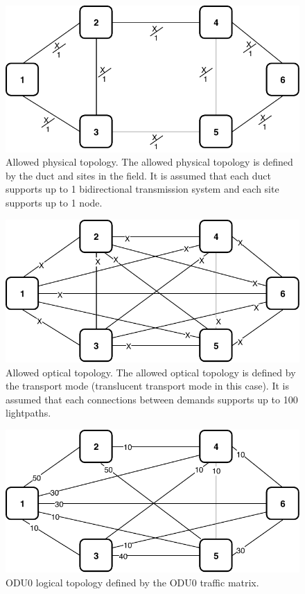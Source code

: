 \begin{figure}[h!]
\centering
\includegraphics[width=12cm]{sdf/ilp/translucent_survivability/figures/allowed_physical_topology}
\caption{Allowed physical topology. The allowed physical topology is defined by the duct and sites in the field. It is assumed that each duct supports up to 1 bidirectional transmission system and each site supports up to 1 node.}
\label{allowed3_physical_medium}
\end{figure}
\vspace{11pt}
\begin{figure}[h!]
\centering
\includegraphics[width=12cm]{sdf/ilp/translucent_survivability/figures/allowed_optical_topology}
\caption{Allowed optical topology. The allowed optical topology is defined by the transport mode (translucent transport mode in this case). It is assumed that each connections between demands supports up to 100 lightpaths.}
\label{allowed3_optical_medium}
\end{figure}

\newpage
\begin{figure}[h!]
\centering
\includegraphics[width=12cm]{sdf/ilp/translucent_survivability/figures/logical_topology_ODU0_medium}
\caption{ODU0 logical topology defined by the ODU0 traffic matrix.}
\label{logical3_ODU0_medium}
\end{figure}

